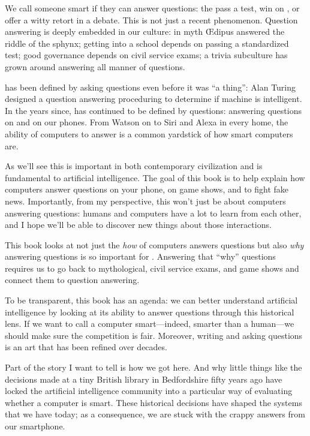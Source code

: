 We call someone smart if they can answer questions: the pass a test, win
on \jeopardy{}, or offer a witty retort in a debate.
%
This is not just a recent phenomenon.
%
Question answering is deeply embedded in
our culture:
%
in myth \OE{}dipus answered the riddle of the sphynx;
%
getting into a school depends on passing a standardized test;
%
good governance depends on civil service exams;
%
a trivia subculture has grown around answering all manner of questions.

 has been defined by asking questions even before it was ``a
thing'': Alan Turing designed a question answering proceduring to
determine if machine is intelligent.
%
In the years since,  has continued to be defined by questions:
answering questions on \jeopardy{} and on our phones.
%
From  Watson on \jeopardy{} to Siri and Alexa in every home, the ability of
computers to answer is a common yardstick of how smart computers are.

As we’ll see this is important in both contemporary civilization and is
fundamental to artificial intelligence.  The goal of this book is to help
explain how computers answer questions on your phone, on game shows, and to
fight fake news.  Importantly, from my perspective, this won’t just be about
computers answering questions: humans and computers have a lot to learn from
each other, and I hope we’ll be able to discover new things about those
interactions.

This book looks at not just the \emph{how} of computers answers
questions but also \emph{why} answering questions is so important
for .
%
Answering that ``why'' questions requires us to go back to
mythological, civil service exams, and game shows and connect them
to  question answering.

To be transparent, this book has an agenda: we can better understand
artificial intelligence by looking at its ability to answer questions
through this historical lens.
%
If we want to call a computer smart---indeed, smarter than a
human---we should make sure the competition is fair.
%
Moreover, writing and asking questions is an art that has been refined
over decades.

Part of the story I want to tell is how we got here.
%
And why little things like the decisions made at a tiny British
library in Bedfordshire fifty years ago have locked the artificial
intelligence community into a particular way of evaluating whether a
computer is smart.
%
These historical decisions have shaped the systems that we have today;
as a consequence, we are stuck with the crappy answers from our
smartphone.


